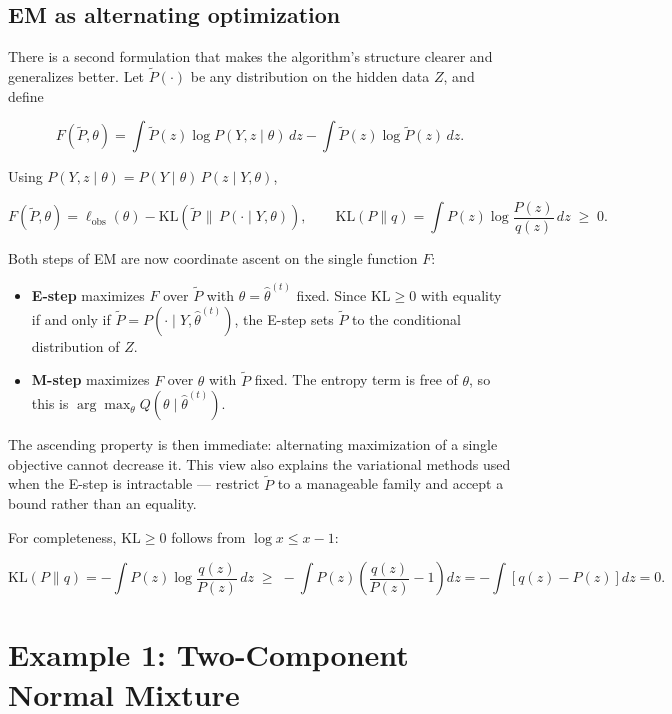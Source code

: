 \documentclass[
  letterpaper,
  DIV=11,
  numbers=noendperiod]{scrreprt}
\providecommand{\tightlist}{%
  \setlength{\itemsep}{0pt}\setlength{\parskip}{0pt}}
\begin{document}
\subsection{EM as alternating
optimization}\label{em-as-alternating-optimization}

There is a second formulation that makes the algorithm's structure
clearer and generalizes better. Let \(\tilde P(\cdot)\) be any
distribution on the hidden data \(Z\), and define

\[
F\!\left(\tilde P, \theta\right)
= \int \tilde P(z) \log P(Y, z \mid \theta) \, dz
- \int \tilde P(z) \log \tilde P(z) \, dz .
\]

Using \(P(Y, z \mid \theta) = P(Y \mid \theta) \, P(z \mid Y, \theta)\),

\[
F\!\left(\tilde P, \theta\right)
= \ell_{\text{obs}}(\theta) - \mathrm{KL}\!\left(\tilde P \,\|\, P(\cdot \mid Y, \theta)\right),
\qquad
\mathrm{KL}(P \| q) = \int P(z) \log \frac{P(z)}{q(z)} \, dz \; \ge\; 0 .
\]

Both steps of EM are now coordinate ascent on the single function \(F\):

\begin{itemize}
\tightlist
\item
  \textbf{E-step} maximizes \(F\) over \(\tilde P\) with
  \(\theta = \hat\theta^{(t)}\) fixed. Since \(\mathrm{KL} \ge 0\) with
  equality if and only if
  \(\tilde P = P(\cdot \mid Y, \hat\theta^{(t)})\), the E-step sets
  \(\tilde P\) to the conditional distribution of \(Z\).
\item
  \textbf{M-step} maximizes \(F\) over \(\theta\) with \(\tilde P\)
  fixed. The entropy term is free of \(\theta\), so this is
  \(\arg\max_\theta Q(\theta \mid \hat\theta^{(t)})\).
\end{itemize}

The ascending property is then immediate: alternating maximization of a
single objective cannot decrease it. This view also explains the
variational methods used when the E-step is intractable --- restrict
\(\tilde P\) to a manageable family and accept a bound rather than an
equality.

For completeness, \(\mathrm{KL} \ge 0\) follows from
\(\log x \le x - 1\):

\[
\mathrm{KL}(P \| q) = -\int P(z) \log \frac{q(z)}{P(z)} \, dz
\;\ge\; -\int P(z) \left(\frac{q(z)}{P(z)} - 1\right) dz
= -\int \left[q(z) - P(z)\right] dz = 0 .
\]

\section{Example 1: Two-Component Normal Mixture}\label{sec-mixture}
\end{document}

